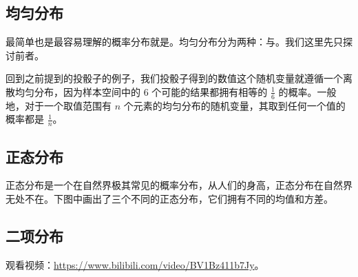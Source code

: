 \documentclass{styles/main}
\begin{document}
%  


\subsection{均匀分布}

  最简单也是最容易理解的概率分布就是。均匀分布分为两种：与。我们这里先只探讨前者。
  
  回到之前提到的投骰子的例子，我们投骰子得到的数值这个随机变量就遵循一个离散均匀分布，因为样本空间中的 6 个可能的结果都拥有相等的 $\frac{1}{6}$ 的概率。一般地，对于一个取值范围有 $n$ 个元素的均匀分布的随机变量，其取到任何一个值的概率都是 $\frac{1}{n}$。
  

\subsection{正态分布}
  
  正态分布是一个在自然界极其常见的概率分布，从人们的身高，正态分布在自然界无处不在。下图中画出了三个不同的正态分布，它们拥有不同的均值和方差。
  
  \begin{figure}[h!]
  \centering
  \end{figure}


\subsection{二项分布}
  
  观看视频：\url{https://www.bilibili.com/video/BV1Bz411b7Jy}。
\end{document}
